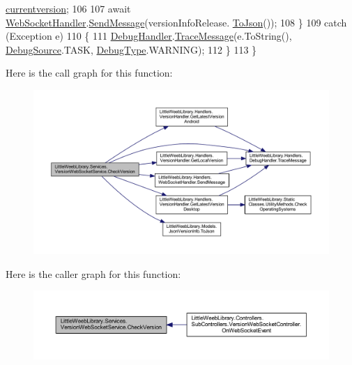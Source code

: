 \begin{DoxyCode}
      \mbox{\hyperlink{class_little_weeb_library_1_1_models_1_1_json_version_info_a9a74ca950016eb93a1ecb4d9089d9f2c}{currentversion}};
106 
107                 await \mbox{\hyperlink{class_little_weeb_library_1_1_handlers_1_1_web_socket_handler}{WebSocketHandler}}.\mbox{\hyperlink{class_little_weeb_library_1_1_handlers_1_1_web_socket_handler_a1de289d54d665a32c93478c68d3e6ad0}{SendMessage}}(versionInfoRelease.
      \mbox{\hyperlink{class_little_weeb_library_1_1_models_1_1_json_version_info_a79b72a4b31accba79e2fbf1ca93297c4}{ToJson}}());
108             \}
109             \textcolor{keywordflow}{catch} (Exception e)
110             \{
111                 \mbox{\hyperlink{class_little_weeb_library_1_1_handlers_1_1_debug_handler}{DebugHandler}}.\mbox{\hyperlink{class_little_weeb_library_1_1_handlers_1_1_debug_handler_afccb37dfd6b2114af72000c2f4fe4607}{TraceMessage}}(e.ToString(), 
      \mbox{\hyperlink{namespace_little_weeb_library_1_1_handlers_a2a6ca0775121c9c503d58aa254d292be}{DebugSource}}.TASK, \mbox{\hyperlink{namespace_little_weeb_library_1_1_handlers_ab66019ed40462876ec4e61bb3ccb0a62}{DebugType}}.WARNING);
112             \}
113         \}
\end{DoxyCode}
Here is the call graph for this function\+:\nopagebreak
\begin{figure}[H]
\begin{center}
\leavevmode
\includegraphics[width=350pt]{class_little_weeb_library_1_1_services_1_1_version_web_socket_service_af1a64a24e2d1b2299b82ba81b3c4a537_cgraph}
\end{center}
\end{figure}
Here is the caller graph for this function\+:\nopagebreak
\begin{figure}[H]
\begin{center}
\leavevmode
\includegraphics[width=350pt]{class_little_weeb_library_1_1_services_1_1_version_web_socket_service_af1a64a24e2d1b2299b82ba81b3c4a537_icgraph}
\end{center}
\end{figure}


